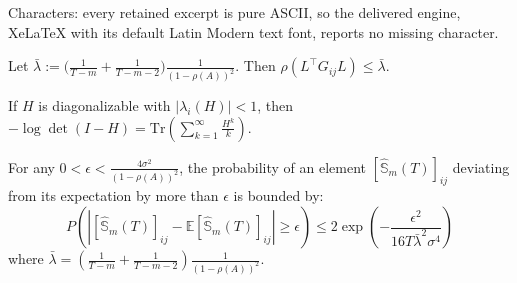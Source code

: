 \documentclass[10pt,a4paper]{amsart}
\begin{document}
Characters: every retained excerpt is pure ASCII, so the delivered engine, XeLaTeX with its default Latin Modern text font, reports no missing character.
\begin{lemma}
\label{lem:spectral_bound}
Let $\bar{\lambda} := \big(\frac{1}{T-m}+\frac{1}{T-m-2}\big)\frac{1}{(1-\rho(A))^2}$. Then
\(
\rho(L^\top G_{ij}L)\le \bar{\lambda}.
\)
\end{lemma}

\begin{lemma}
\label{lemma:Log-determinant trace}
If $H$ is diagonalizable with $|\lambda_i(H)|<1$, then
\(
-\log\det(I-H)=\mathrm{Tr}\!\left(\sum_{k=1}^\infty \frac{H^k}{k}\right).
\)
\end{lemma}

\begin{lemma}
\label{lem:Chernoff elementwise}
For any $0<\epsilon <\frac{4\sigma^2}{(1-\rho(A))^2}$, the probability of an element $[\hat{\mathbb{S}}_m(T)]_{ij}$ deviating from its expectation by more than $\epsilon$ is bounded by:
$$
P\left(\left|[\hat{\mathbb{S}}_m(T)]_{ij} - \mathbb{E}[\hat{\mathbb{S}}_m(T)]_{ij}\right| \ge \epsilon\right) \le 2\exp \left(- \frac{\epsilon^2}{16T\bar{\lambda}^2\sigma^4} \right)
$$
where $\bar{\lambda} = \left( \frac{1}{T-m} + \frac{1}{T-m-2} \right) \frac{1}{(1-\rho(A))^2}$. 
\end{lemma}
\end{document}
